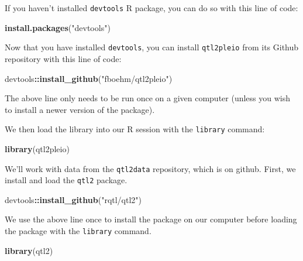 \documentclass[oneside]{book}
\newenvironment{Shaded}{\begin{snugshade}}{\end{snugshade}}
\newcommand{\KeywordTok}[1]{\textcolor[rgb]{0.13,0.29,0.53}{\textbf{#1}}}
\newcommand{\NormalTok}[1]{#1}
\newcommand{\OperatorTok}[1]{\textcolor[rgb]{0.81,0.36,0.00}{\textbf{#1}}}
\newcommand{\StringTok}[1]{\textcolor[rgb]{0.31,0.60,0.02}{#1}}
\begin{document}
If you haven't installed \texttt{devtools} R package, you can do so with
this line of code:

\begin{Shaded}
\begin{Highlighting}[]
\KeywordTok{install.packages}\NormalTok{(}\StringTok{"devtools"}\NormalTok{)}
\end{Highlighting}
\end{Shaded}

Now that you have installed \texttt{devtools}, you can install
\texttt{qtl2pleio} from its Github repository with this line of code:

\begin{Shaded}
\begin{Highlighting}[]
\NormalTok{devtools}\OperatorTok{::}\KeywordTok{install_github}\NormalTok{(}\StringTok{"fboehm/qtl2pleio"}\NormalTok{)}
\end{Highlighting}
\end{Shaded}

The above line only needs to be run once on a given computer (unless you
wish to install a newer version of the package).

We then load the library into our R session with the \texttt{library}
command:

\begin{Shaded}
\begin{Highlighting}[]
\KeywordTok{library}\NormalTok{(qtl2pleio)}
\end{Highlighting}
\end{Shaded}

We'll work with data from the \texttt{qtl2data} repository, which is on
github. First, we install and load the \texttt{qtl2} package.

\begin{Shaded}
\begin{Highlighting}[]
\NormalTok{devtools}\OperatorTok{::}\KeywordTok{install_github}\NormalTok{(}\StringTok{"rqtl/qtl2"}\NormalTok{)}
\end{Highlighting}
\end{Shaded}

We use the above line once to install the package on our computer before
loading the package with the \texttt{library} command.

\begin{Shaded}
\begin{Highlighting}[]
\KeywordTok{library}\NormalTok{(qtl2)}
\end{Highlighting}
\end{Shaded}
\end{document}
